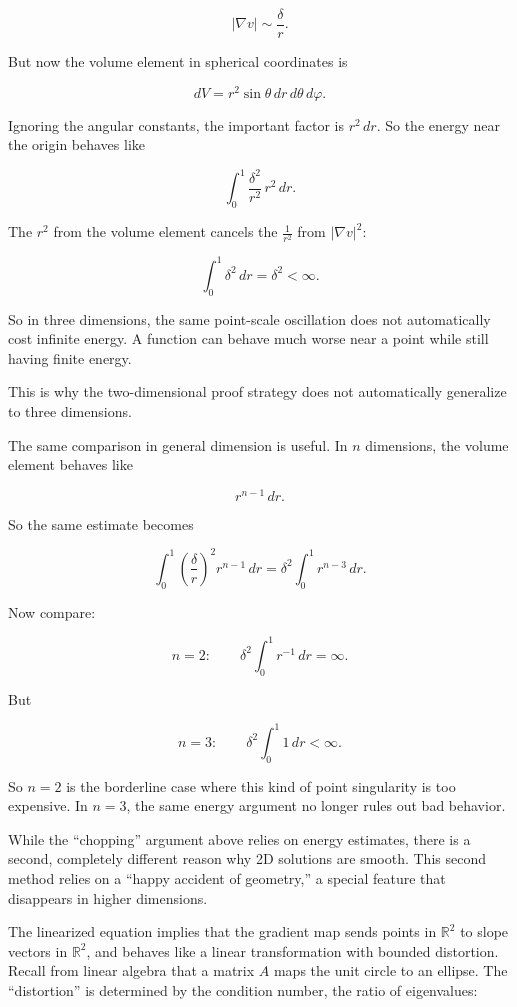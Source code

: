 \documentclass[11pt]{article}
\begin{document}
\[
|\nabla v|\sim \frac{\delta}{r}.
\]

But now the volume element in spherical coordinates is

\[
dV=r^2\sin\theta\,dr\,d\theta\,d\varphi.
\]

Ignoring the angular constants, the important factor is \(r^2\,dr\). So
the energy near the origin behaves like

\[
\int_0^1 \frac{\delta^2}{r^2}\,r^2\,dr.
\]

The \(r^2\) from the volume element cancels the \(\frac{1}{r^2}\) from
\(|\nabla v|^2\):

\[
\int_0^1 \delta^2\,dr=\delta^2<\infty.
\]

So in three dimensions, the same point-scale oscillation does not
automatically cost infinite energy. A function can behave much worse
near a point while still having finite energy.

This is why the two-dimensional proof strategy does not automatically
generalize to three dimensions.

The same comparison in general dimension is useful. In \(n\) dimensions,
the volume element behaves like

\[
r^{n-1}\,dr.
\]

So the same estimate becomes

\[
\int_0^1\left(\frac{\delta}{r}\right)^2r^{n-1}\,dr
=\delta^2\int_0^1 r^{n-3}\,dr.
\]

Now compare:

\[
n=2:\qquad \delta^2\int_0^1 r^{-1}\,dr=\infty.
\]

But

\[
n=3:\qquad \delta^2\int_0^1 1\,dr<\infty.
\]

So \(n=2\) is the borderline case where this kind of point singularity
is too expensive. In \(n=3\), the same energy argument no longer rules
out bad behavior.

While the ``chopping'' argument above relies on energy estimates, there
is a second, completely different reason why 2D solutions are smooth.
This second method relies on a ``happy accident of geometry,'' a special
feature that disappears in higher dimensions.

The linearized equation implies that the gradient map sends points in
\(\mathbb{R}^2\) to slope vectors in \(\mathbb{R}^2\), and behaves like
a linear transformation with bounded distortion. Recall from linear
algebra that a matrix \(A\) maps the unit circle to an ellipse. The
``distortion'' is determined by the condition number, the ratio of
eigenvalues: \hypertarget{eq-distortion}{}\label{eq-distortion}
\end{document}
